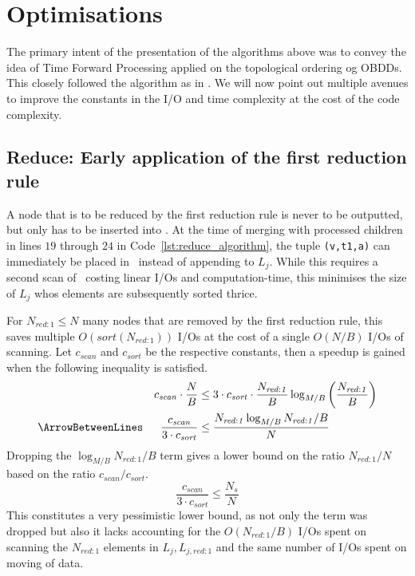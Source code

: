 \section{Optimisations} \label{sec:optimisations}
The primary intent of the presentation of the algorithms above was to convey the
idea of Time Forward Processing applied on the topological ordering og OBDDs.
This closely followed the algorithm as in \cite{Arge96}. We will now point out
multiple avenues to improve the constants in the I/O and time complexity at the
cost of the code complexity.

\subsection{Reduce: Early application of the first reduction rule}
A node that is to be reduced by the first reduction rule is never to be
outputted, but only has to be inserted into \ReduceQdep. At the time of merging
with processed children in lines $19$ through $24$ in
Code~\ref{lst:reduce_algorithm}, the tuple \lstinline{(v,t1,a)} can immediately
be placed in \ReduceQdep\ instead of appending to $L_j$. While this requires a
second scan of \ReduceLdep\ costing linear I/Os and computation-time, this
minimises the size of $L_j$ whos elements are subsequently sorted thrice.

For $N_{\mathit{red}:1} \leq N$ many nodes that are removed by the first
reduction rule, this saves multiple $O(sort(N_{\mathit{red:1}}))$ I/Os at the
cost of a single $O(N/B)$ I/Os of scanning. Let $c_{\mathit{scan}}$ and
$c_{\mathit{sort}}$ be the respective constants, then a speedup is gained when
the following inequality is satisfied.
\begin{alignat*}{2}
  &&c_{\mathit{scan}} \cdot \frac{N}{B}
  & \leq 3 \cdot c_{\mathit{sort}} \cdot \frac{N_{\mathit{red:1}}}{B}
           \log_{M/B} \left( \frac{N_{\mathit{red:1}}}{B} \right)
  \\ \ArrowBetweenLines
  &&\frac{c_{\mathit{scan}}}{3 \cdot c_{\mathit{sort}}}
  & \leq \frac{N_{\mathit{red:1}} \log_{M/B} N_{\mathit{red:1}} / B}{N}
\end{alignat*}
Dropping the $\log_{M/B} N_{\mathit{red:1}} / B$ term gives a lower bound on the
ratio $N_{\mathit{red:1}} / N$ based on the ratio $c_{\mathit{scan}} /
c_{\mathit{sort}}$.
\begin{equation}
    \frac{c_{\mathit{scan}}}{3 \cdot c_{\mathit{sort}}} \leq \frac{N_s}{N}
\end{equation}
This constitutes a very pessimistic lower bound, as not only the term was
dropped but also it lacks accounting for the $O(N_{\mathit{red:1}} / B)$ I/Os
spent on scanning the $N_{\mathit{red:1}}$ elements in $L_j,
L_{j,\mathit{red:1}}$ and the same number of I/Os spent on moving of data.

